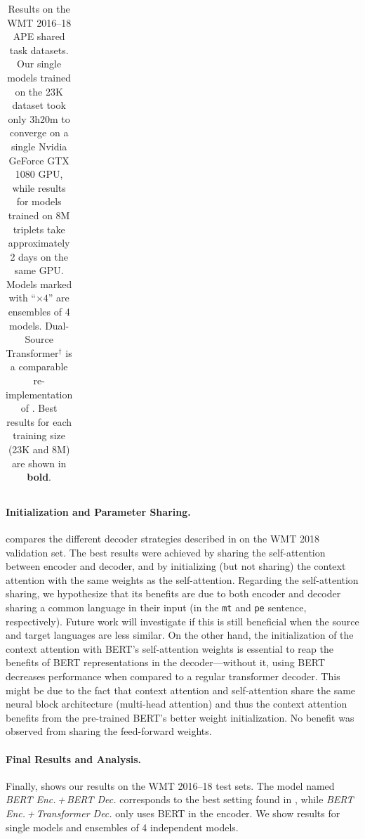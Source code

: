 \begin{landscape}
\begin{table}[t]
\begin{tabular}{lccccccc}
            \bottomrule
        \end{tabular}
        \caption{Results on the WMT 2016--18 APE shared task datasets. Our
            single models trained on the 23K dataset took only 3h20m to converge
            on a single Nvidia GeForce GTX 1080 GPU, while results for models
            trained on 8M triplets take approximately 2 days on the same GPU.
            Models marked with ``$\times 4$'' are ensembles of 4 models.
            Dual-Source Transformer$^\dagger$ is a comparable re-implementation
            of \citet{junczys2018ms}. Best results for each training size (23K and 8M) are shown in \textbf{bold}.}
        \label{tab:results_smt}
    \end{table}
\end{landscape}

\paragraph*{Initialization and Parameter Sharing.}
 compares the different decoder
strategies described in  on the WMT 2018
validation set. The best results were achieved by sharing the
self-attention between encoder and decoder, and by initializing (but
not sharing) the context attention with the same weights as the
self-attention. Regarding the self-attention sharing, we hypothesize
that its benefits are due to both encoder and decoder sharing a
common language in their input (in the {\tt mt} and {\tt pe}
sentence, respectively). Future work will investigate if this is
still beneficial when the source and target languages are less
similar. On the other hand, the initialization of the context
attention with BERT's self-attention weights is essential to reap the
benefits of BERT representations in the decoder---without it, using
BERT decreases performance when compared to a regular transformer
decoder. This might be due to the fact that context attention and
self-attention share the same neural block architecture (multi-head
attention) and thus the context attention benefits from the
pre-trained BERT's better weight initialization. No benefit was
observed from sharing the feed-forward weights.

\paragraph*{Final Results and Analysis.}
Finally,  shows our results on the WMT
2016--18 test sets. The model named \emph{BERT Enc.\,+\,BERT Dec.}
corresponds to the best setting found in
, while \emph{BERT Enc.\,+\,Transformer
    Dec.} only uses BERT in the encoder. We show results for single
models and ensembles of 4 independent models.

